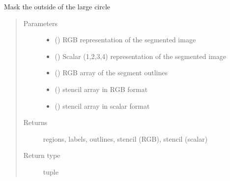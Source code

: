 \documentclass[letterpaper,10pt,english]{sphinxmanual}
\begin{document}
\begin{fulllineitems}
\label{\detokenize{createregions:createregions.outer_circle}}
Mask the outside of the large circle
\begin{quote}\begin{description}
\item[{Parameters}] \leavevmode\begin{itemize}
\item {} 
 () \textendash{} RGB representation of the segmented image

\item {} 
 () \textendash{} Scalar (1,2,3,4) representation of the segmented image

\item {} 
 () \textendash{} RGB array of the segment outlines

\item {} 
 () \textendash{} stencil array in RGB format

\item {} 
 () \textendash{} stencil array in scalar format

\end{itemize}

\item[{Returns}] \leavevmode
regions, labels, outlines, stencil (RGB), stencil (scalar)

\item[{Return type}] \leavevmode
tuple

\end{description}\end{quote}

\end{fulllineitems}

\end{document}
